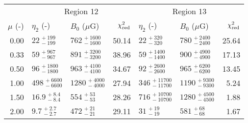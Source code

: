\begin{tabular}{@{}rllr llr@{}}
\cmidrule{1-7}
{} & \multicolumn{3}{c}{Region 12\tablenotemark{b}}
   & \multicolumn{3}{c}{Region 13\tablenotemark{b}} \\
\cmidrule(lr){2-4} \cmidrule(l){5-7}
$\mu$ (-) & $\eta_2$ (-) & $B_0$ ($\mu$G) & $\chi^2_{\mathrm{red}}$
          & $\eta_2$ (-) & $B_0$ ($\mu$G) & $\chi^2_{\mathrm{red}}$ \\
\cmidrule{1-7}
0.00 & $22^{\,+199}_{\,-199}$ & $762^{\,+1600}_{\,-1600}$       & 50.14
     & $22^{\,+320}_{\,-320}$ & $780^{\,+2400}_{\,-2400}$       & 25.64 \\
0.33 & $59^{\,+967}_{\,-967}$ & $891^{\,+3200}_{\,-3200}$       & 38.96
     & $59^{\,+1400}_{\,-1400}$ & $900^{\,+4900}_{\,-4900}$     & 17.13 \\
0.50 & $96^{\,+1800}_{\,-1800}$ & $963^{\,+4100}_{\,-4100}$     & 34.67
     & $92^{\,+2600}_{\,-2600}$ & $965^{\,+6200}_{\,-6200}$     & 13.45 \\
1.00 & $498^{\,+6600}_{\,-6600}$ & $1280^{\,+4000}_{\,-4000}$   & 27.94
     & $346^{\,+11700}_{\,-11700}$ & $1190^{\,+9300}_{\,-9300}$ & 5.24 \\
1.50 & $16.9^{\,+8.4}_{\,-8.4}$ & $554^{\,+53}_{\,-53}$         & 28.26
     & $716^{\,+10700}_{\,-10700}$ & $1280^{\,+4500}_{\,-4500}$ & 1.88 \\
2.00 & $9.7^{\,+2.7}_{\,-2.7}$ & $472^{\,+21}_{\,-21}$          & 29.11
     & $31^{\,+19}_{\,-19}$ & $581^{\,+68}_{\,-68}$             & 1.67 \\

\bottomrule
\end{tabular}
